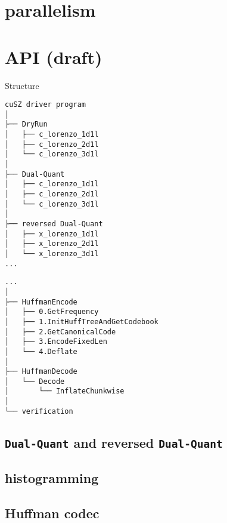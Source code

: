\section{parallelism}

\section{API (draft)}

Structure

\begin{multicols}{2}
\begin{verbatim}
cuSZ driver program
│
├── DryRun
│   ├── c_lorenzo_1d1l
│   ├── c_lorenzo_2d1l
│   └── c_lorenzo_3d1l
│
├── Dual-Quant
│   ├── c_lorenzo_1d1l
│   ├── c_lorenzo_2d1l
│   └── c_lorenzo_3d1l
│
├── reversed Dual-Quant
│   ├── x_lorenzo_1d1l
│   ├── x_lorenzo_2d1l
│   └── x_lorenzo_3d1l
...
\end{verbatim}

\vfill\null
\columnbreak

\begin{verbatim}
...
│
├── HuffmanEncode
│   ├── 0.GetFrequency
│   ├── 1.InitHuffTreeAndGetCodebook
│   ├── 2.GetCanonicalCode
│   ├── 3.EncodeFixedLen
│   └── 4.Deflate
│
├── HuffmanDecode
│   └── Decode
│       └── InflateChunkwise
│
└── verification

\end{verbatim}
\end{multicols}

\subsection{\texorpdfstring{\texttt{Dual-Quant} and reversed
\texttt{Dual-Quant}}{Dual-Quant and reversed Dual-Quant}}

\subsection{histogramming}

\subsection{Huffman codec}

\subsubsection{}
